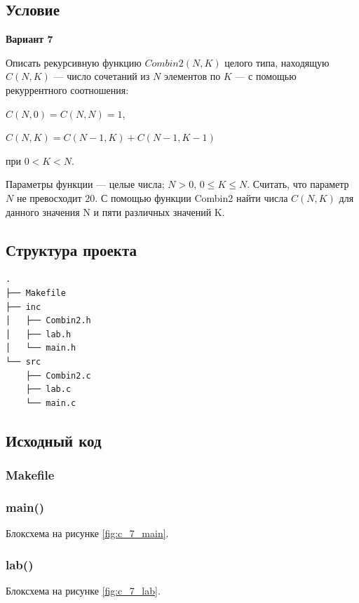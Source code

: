 \documentclass[12pt, a4paper]{article}
\begin{document}
\subsection{Условие}

\begin{center}
    \textbf{Вариант 7}
\end{center}

Описать рекурсивную функцию $Combin2(N, K)$ целого типа, находящую $C(N, K)$ — число сочетаний из $N$ элементов по $K$ — с помощью рекуррентного соотношения:

$C(N, 0) = C(N, N) = 1$,

$C(N, K) = C(N - 1, K) + C(N - 1, K - 1)$

при $0 < K < N$.

Параметры функции — целые числа; $N > 0$, $0 \leq K \leq N$. Считать, что параметр $N$ не превосходит $20$. С помощью функции Combin2 найти числа $C(N, K)$ для данного значения N и пяти различных значений K.

\subsection{Структура проекта}

\begin{verbatim}
.
├── Makefile
├── inc
│   ├── Combin2.h
│   ├── lab.h
│   └── main.h
└── src
    ├── Combin2.c
    ├── lab.c
    └── main.c
\end{verbatim}

\subsection{Исходный код}

\subsubsection{Makefile}


\subsubsection{main()}
Блоксхема на рисунке \ref{fig:c_7_main}.



\subsubsection{lab()}
Блоксхема на рисунке \ref{fig:c_7_lab}.


\end{document}
